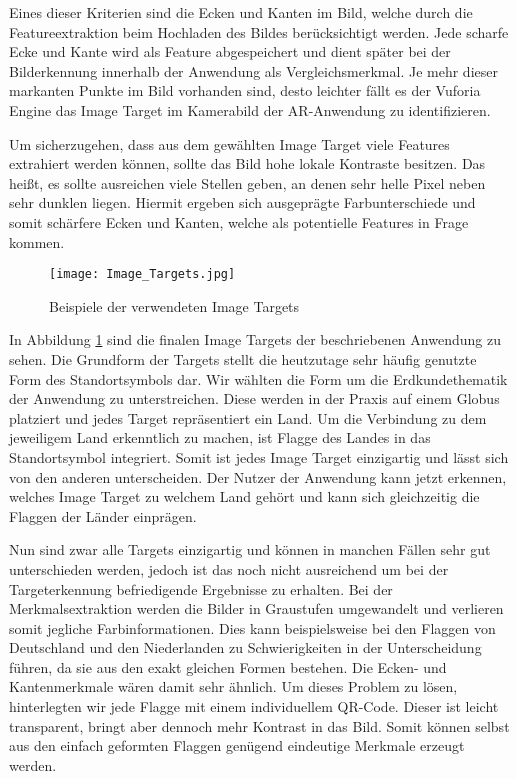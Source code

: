 Eines dieser Kriterien sind die Ecken und Kanten im Bild, welche durch die Featureextraktion beim Hochladen des Bildes berücksichtigt werden. 
Jede scharfe Ecke und Kante wird als Feature abgespeichert und dient später bei der Bilderkennung innerhalb der Anwendung als Vergleichsmerkmal. 
Je mehr dieser markanten Punkte im Bild vorhanden sind, desto leichter fällt es der Vuforia Engine das Image Target im Kamerabild der AR-Anwendung zu identifizieren.

Um sicherzugehen, dass aus dem gewählten Image Target viele Features extrahiert werden können, sollte das Bild hohe lokale Kontraste besitzen. Das heißt, es sollte ausreichen viele Stellen geben, an denen sehr helle Pixel neben sehr dunklen liegen. 
Hiermit ergeben sich ausgeprägte Farbunterschiede und somit schärfere Ecken und Kanten, welche als potentielle Features in Frage kommen.

\begin{figure} [h]
\centering
\texttt{[image: Image\_Targets.jpg]}
\caption{Beispiele der verwendeten Image Targets}
\label{fig:image_targets}
\end{figure}

In Abbildung \ref{fig:image_targets} sind die finalen Image Targets der beschriebenen Anwendung zu sehen.
Die Grundform der Targets stellt die heutzutage sehr häufig genutzte Form des Standortsymbols dar.
Wir wählten die Form um die Erdkundethematik der Anwendung zu unterstreichen.
Diese werden in der Praxis auf einem Globus platziert und jedes Target repräsentiert ein Land.
Um die Verbindung zu dem jeweiligem Land erkenntlich zu machen, ist Flagge des Landes in das Standortsymbol integriert. 
Somit ist jedes Image Target einzigartig und lässt sich von den anderen unterscheiden. 
Der Nutzer der Anwendung kann jetzt erkennen, welches Image Target zu welchem Land gehört und kann sich gleichzeitig die Flaggen der Länder einprägen. 

Nun sind zwar alle Targets einzigartig und können in manchen Fällen sehr gut unterschieden werden, jedoch ist das noch nicht ausreichend um bei der Targeterkennung befriedigende Ergebnisse zu erhalten. 
Bei der Merkmalsextraktion werden die Bilder in Graustufen umgewandelt und verlieren somit jegliche Farbinformationen. Dies kann beispielsweise bei den Flaggen von Deutschland und den Niederlanden zu Schwierigkeiten in der Unterscheidung führen, da sie aus den exakt gleichen Formen bestehen. 
Die Ecken- und Kantenmerkmale wären damit sehr ähnlich. 
Um dieses Problem zu lösen, hinterlegten wir jede Flagge mit einem individuellem QR-Code. 
Dieser ist leicht transparent, bringt aber dennoch mehr Kontrast in das Bild. 
Somit können selbst aus den einfach geformten Flaggen genügend eindeutige Merkmale erzeugt werden.

